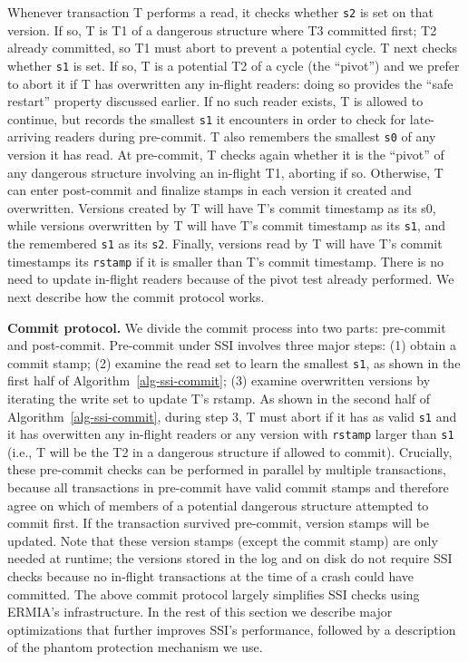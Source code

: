 Whenever transaction T performs a read, it checks whether \texttt{s2} is set on that version. If so, T is T1 of a dangerous structure where T3 committed first; T2 already committed, so T1 must abort to prevent a potential cycle. T next checks whether \texttt{s1} is set. If so, T is a potential T2 of a cycle (the ``pivot'') and we prefer to abort it if T has overwritten any in-flight readers: doing so provides the ``safe restart'' property discussed earlier. If no such reader exists, T is allowed to continue, but records the smallest \texttt{s1} it encounters in order to check for late-arriving readers during pre-commit. T also remembers the smallest \texttt{s0} of any version it has read. At pre-commit, T checks again whether it is the ``pivot'' of any dangerous structure involving an in-flight T1, aborting if so. Otherwise, T can enter post-commit and finalize stamps in each version it created and overwritten. Versions created by T will have T's commit timestamp as its s0, while versions overwritten by T will have T's commit timestamp as its \texttt{s1}, and the remembered \texttt{s1} as its \texttt{s2}. Finally, versions read by T will have T's commit timestamps its \texttt{rstamp} if it is smaller than T's commit timestamp. There is no need to update in-flight readers because of the pivot test already performed. We next describe how the commit protocol works.

{\bf Commit protocol.}
We divide the commit process into two parts: pre-commit and post-commit. Pre-commit under SSI involves three major steps: (1) obtain a commit stamp; (2) examine the read set to learn the smallest \texttt{s1}, as shown in the first half of Algorithm~\ref{alg-ssi-commit}; (3) examine overwritten versions by iterating the write set to update T's rstamp. As shown in the second half of Algorithm~\ref{alg-ssi-commit}, during step 3, T must abort if it has as valid \texttt{s1} and it has overwitten any in-flight readers or any version with \texttt{rstamp} larger than \texttt{s1} (i.e., T will be the T2 in a dangerous structure if allowed to commit). Crucially, these pre-commit checks can be performed in parallel by multiple transactions, because all transactions in pre-commit have valid commit stamps and therefore agree on which of members of a potential dangerous structure attempted to commit first. If the transaction survived pre-commit, version stamps will be updated. Note that these version stamps (except the commit stamp) are only needed at runtime; the versions stored in the log and on disk do not require SSI checks because no in-flight transactions at the time of a crash could have committed. The above commit protocol largely simplifies SSI checks using ERMIA's infrastructure. In the rest of this section
we describe major optimizations that further improves SSI's performance, followed by a description of the phantom protection mechanism we use.


